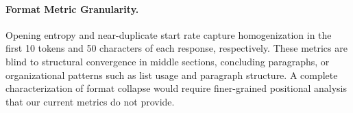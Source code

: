 \paragraph{Format Metric Granularity.}
Opening entropy and near-duplicate start rate capture homogenization in the first 10 tokens and 50 characters of each response, respectively. These metrics are blind to structural convergence in middle sections, concluding paragraphs, or organizational patterns such as list usage and paragraph structure. A complete characterization of format collapse would require finer-grained positional analysis that our current metrics do not provide.